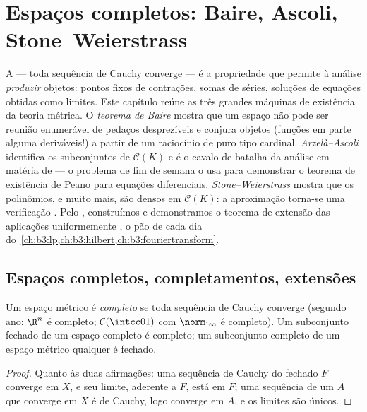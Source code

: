 \chapter{Espaços completos: Baire, Ascoli, Stone--Weierstrass}
\label{ch:b3:complete}

A  --- toda sequência de Cauchy converge --- é a propriedade
que permite à análise \emph{produzir} objetos: pontos fixos de
contrações, somas de séries, soluções de equações obtidas como limites.
Este capítulo reúne as três grandes máquinas de existência da teoria
métrica. O \emph{teorema de Baire} mostra que um espaço  não
pode ser reunião enumerável de pedaços desprezíveis e conjura objetos
(funções  em parte alguma deriváveis!) a partir de um
raciocínio de puro tipo cardinal. \emph{Arzelà--Ascoli} identifica os
subconjuntos  de $\mathcal C(K)$ e é o cavalo de batalha da análise em
matéria de  --- o problema de fim de semana o usa para
demonstrar o teorema de existência de Peano para equações diferenciais.
\emph{Stone--Weierstrass} mostra que os polinômios, e muito mais, são
densos em $\mathcal C(K)$: a aproximação torna-se uma verificação . Pelo
, construímos  e demonstramos o teorema de
extensão das aplicações uniformemente , o pão de cada dia do~\cref{ch:b3:lp,ch:b3:hilbert,ch:b3:fouriertransform}.

\section{Espaços completos, completamentos, extensões}

\begin{definition}\label{def:b3:complete:complete}
Um espaço métrico é \emph{completo} se
toda sequência de Cauchy converge (segundo ano: $\R^n$ é completo;
$\mathcal C(\intcc01)$ com $\norm\cdot_\infty$ é completo). Um subconjunto fechado de um espaço completo é
completo; um subconjunto completo de um espaço métrico qualquer é
fechado.
\end{definition}

\begin{proof}
Quanto às duas afirmações: uma sequência de Cauchy do fechado $F$
converge em $X$, e seu limite, aderente a $F$, está em $F$; uma
sequência de um $A$  que converge em $X$ é de Cauchy,
logo converge em $A$, e os limites são únicos.
\end{proof}

